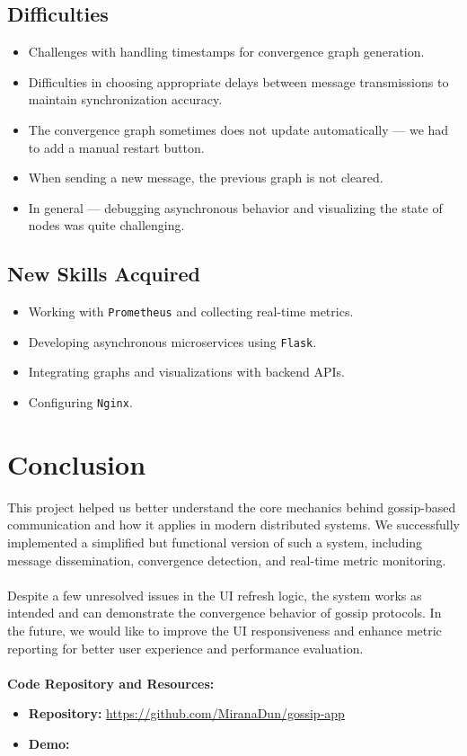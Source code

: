 \documentclass[a4paper,12pt]{article}
\begin{document}
\subsection*{Difficulties}
\begin{itemize}
    \item Challenges with handling timestamps for convergence graph generation.
    \item Difficulties in choosing appropriate delays between message transmissions to maintain synchronization accuracy.
    \item The convergence graph sometimes does not update automatically — we had to add a manual restart button.
    \item When sending a new message, the previous graph is not cleared.
    \item In general — debugging asynchronous behavior and visualizing the state of nodes was quite challenging.
\end{itemize}

\subsection*{New Skills Acquired}
\begin{itemize}
    \item Working with \verb|Prometheus| and collecting real-time metrics.
    \item Developing asynchronous microservices using \verb|Flask|.
    \item Integrating graphs and visualizations with backend APIs.
    \item Configuring \verb|Nginx|.
\end{itemize}

\section{Conclusion}

This project helped us better understand the core mechanics behind gossip-based communication and how it applies in modern distributed systems. We successfully implemented a simplified but functional version of such a system, including message dissemination, convergence detection, and real-time metric monitoring.\\\\
Despite a few unresolved issues in the UI refresh logic, the system works as intended and can demonstrate the convergence behavior of gossip protocols. In the future, we would like to improve the UI responsiveness and enhance metric reporting for better user experience and performance evaluation.\\\\
\textbf{Code Repository and Resources:}
\begin{itemize}
    \item \textbf{Repository:} \url{https://github.com/MiranaDun/gossip-app}
    \item \textbf{Demo:} \url{}
\end{itemize}
\end{document}
